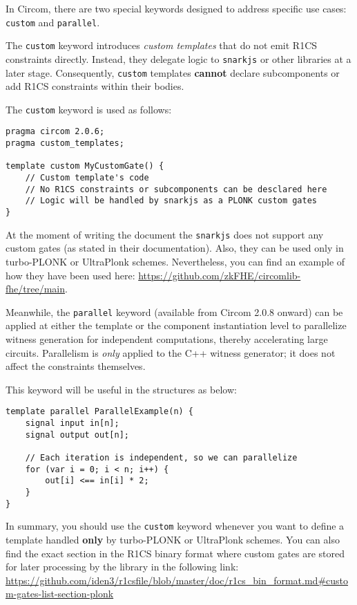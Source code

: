 \documentclass[../lecture-notes-148x210.tex]{subfiles}
\begin{document}
In Circom, there are two special keywords designed to address specific use cases: \texttt{custom} and \texttt{parallel}.

The \texttt{custom} keyword introduces \emph{custom templates} that do not emit R1CS constraints directly.
Instead, they delegate logic to \texttt{snarkjs} or other libraries at a later stage.
Consequently, \texttt{custom} templates \textbf{cannot} declare subcomponents or add R1CS constraints within their bodies.

The \texttt{custom} keyword is used as follows:

\begin{lstlisting}[language=Circom,basicstyle=\ttfamily\footnotesize]
pragma circom 2.0.6;
pragma custom_templates;

template custom MyCustomGate() {
    // Custom template's code
    // No R1CS constraints or subcomponents can be desclared here
    // Logic will be handled by snarkjs as a PLONK custom gates
}
\end{lstlisting}

\begin{remark}
    At the moment of writing the document the \texttt{snarkjs} does not support any custom gates (as stated in their documentation).
    Also, they can be used only in turbo-PLONK or UltraPlonk schemes.
    Nevertheless, you can find an example of how they have been used here: \url{https://github.com/zkFHE/circomlib-fhe/tree/main}.
\end{remark}

Meanwhile, the \texttt{parallel} keyword (available from Circom 2.0.8 onward) can be applied at either the template or
the component instantiation level to parallelize witness generation for independent computations, thereby accelerating large circuits.
Parallelism is \emph{only} applied to the C++ witness generator; it does not affect the constraints themselves.

This keyword will be useful in the structures as below:

\begin{lstlisting}[language=Circom,basicstyle=\ttfamily\footnotesize]
template parallel ParallelExample(n) {
    signal input in[n];
    signal output out[n];

    // Each iteration is independent, so we can parallelize
    for (var i = 0; i < n; i++) {
        out[i] <== in[i] * 2;
    }
}
\end{lstlisting}

In summary, you should use the \texttt{custom} keyword whenever you want to define a template handled \textbf{only} by turbo-PLONK or UltraPlonk schemes.
You can also find the exact section in the R1CS binary format where custom gates are stored for later processing by the library in the following link: \\
\url{https://github.com/iden3/r1csfile/blob/master/doc/r1cs_bin_format.md\#custom-gates-list-section-plonk}
\end{document}
